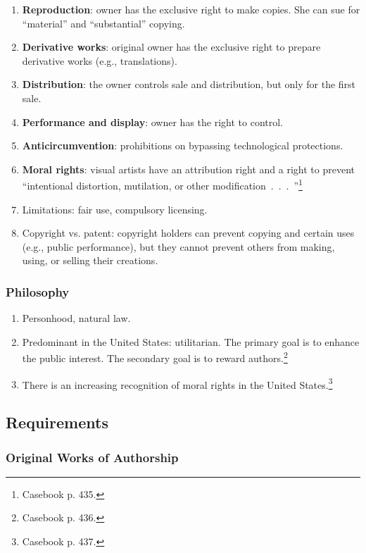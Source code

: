 \begin{enumerate}
    \item \textbf{Reproduction}: owner has the exclusive right to make copies. 
    She can sue for ``material'' and ``substantial'' copying.
    \item \textbf{Derivative works}: original owner has the exclusive right to 
    prepare derivative works (e.g., translations).
    \item \textbf{Distribution}: the owner controls sale and distribution, but 
    only for the first sale.
    \item \textbf{Performance and display}: owner has the right to control.
    \item \textbf{Anticircumvention}: prohibitions on bypassing technological 
    protections.
    \item \textbf{Moral rights}: visual artists have an attribution right and 
    a right to prevent ``intentional distortion, mutilation, or other 
    modification~.~.~.~''\footnote{Casebook p. 435.}
    \item Limitations: fair use, compulsory licensing.
    \item Copyright vs. patent: copyright holders can prevent copying and 
    certain uses (e.g., public performance), but they cannot prevent others 
    from making, using, or selling their creations.
\end{enumerate}

\subsubsection{Philosophy}

\begin{enumerate}
    \item Personhood, natural law.
    \item Predominant in the United States: utilitarian. The primary goal is 
    to enhance the public interest. The secondary goal is to reward 
    authors.\footnote{Casebook p. 436.}
    \item There is an increasing recognition of moral rights in the United 
    States.\footnote{Casebook p. 437.}
\end{enumerate}

\subsection{Requirements}

\subsubsection{Original Works of Authorship}

